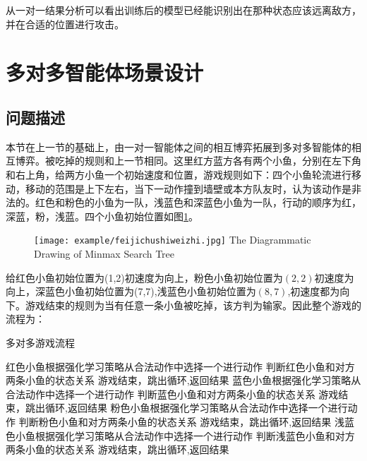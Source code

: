 从一对一结果分析可以看出训练后的模型已经能识别出在那种状态应该远离敌方，并在合适的位置进行攻击。


\section{多对多智能体场景设计}

\subsection{问题描述}
本节在上一节的基础上，由一对一智能体之间的相互博弈拓展到多对多智能体的相互博弈。被吃掉的规则和上一节相同。这里红方蓝方各有两个小鱼，分别在左下角和右上角，给两方小鱼一个初始速度和位置，游戏规则如下：四个小鱼轮流进行移动，移动的范围是上下左右，当下一动作撞到墙壁或本方队友时，认为该动作是非法的。红色和粉色的小鱼为一队，浅蓝色和深蓝色小鱼为一队，行动的顺序为红，深蓝，粉，浅蓝。四个小鱼初始位置如图\ref{小鱼初始位置}。

\begin{figure}[!htbp]
	\centering
	\texttt{[image: example/feijichushiweizhi.jpg]}
	{The Diagrammatic Drawing of Minmax Search Tree}
	\label{小鱼初始位置}
\end{figure}

给红色小鱼初始位置为(1,2)初速度为向上，粉色小鱼初始位置为$(2,2)$初速度为向上，深蓝色小鱼初始位置为(7,7),浅蓝色小鱼初始位置为$(8,7)$,初速度都为向下。游戏结束的规则为当有任意一条小鱼被吃掉，该方判为输家。因此整个游戏的流程为：

\begin{algorithm}[!htbp]
	\caption{多对多游戏流程}%
	\begin{algorithmic}[1]%
		\State 红色小鱼根据强化学习策略从合法动作中选择一个进行动作
		\State 判断红色小鱼和对方两条小鱼的状态关系
		\State 游戏结束，跳出循环,返回结果
		\EndIf
		\State 蓝色小鱼根据强化学习策略从合法动作中选择一个进行动作
		\State 判断蓝色小鱼和对方两条小鱼的状态关系
		\State 游戏结束，跳出循环,返回结果
		\EndIf
		\State 粉色小鱼根据强化学习策略从合法动作中选择一个进行动作
		\State 判断粉色小鱼和对方两条小鱼的状态关系
		\State 游戏结束，跳出循环,返回结果
		\EndIf
		\State 浅蓝色小鱼根据强化学习策略从合法动作中选择一个进行动作
		\State 判断浅蓝色小鱼和对方两条小鱼的状态关系
		\State 游戏结束，跳出循环,返回结果
		\EndIf
		
		\EndFor
	\end{algorithmic}
\end{algorithm}
